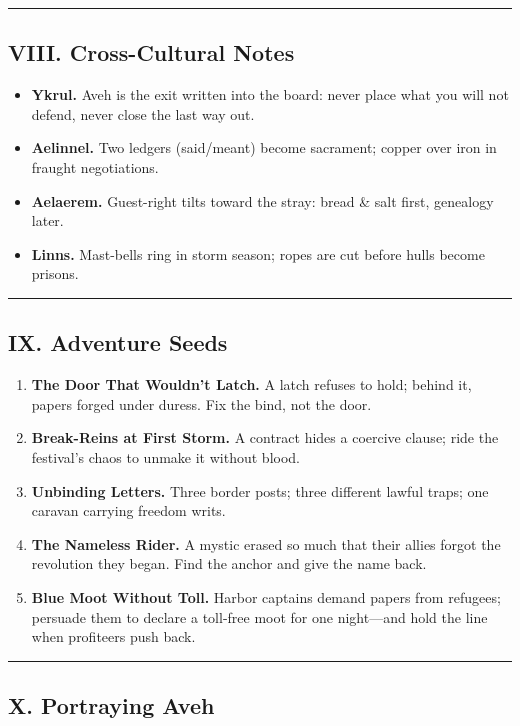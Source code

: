 \documentclass[11pt,letterpaper]{article}
\begin{document}
\medskip\hrule\medskip

\subsection{VIII. Cross-Cultural Notes}

\begin{itemize}[leftmargin=*]
  \item \textbf{Ykrul.} Aveh is the exit written into the board: never place what you will not defend, never close the last way out.
  \item \textbf{Aelinnel.} Two ledgers (said/meant) become sacrament; copper over iron in fraught negotiations.
  \item \textbf{Aelaerem.} Guest-right tilts toward the stray: bread \& salt first, genealogy later.
  \item \textbf{Linns.} Mast-bells ring in storm season; ropes are cut before hulls become prisons.
\end{itemize}

\medskip\hrule\medskip

\subsection{IX. Adventure Seeds}

\begin{enumerate}[leftmargin=*]
  \item \textbf{The Door That Wouldn't Latch.} A latch refuses to hold; behind it, papers forged under duress. Fix the bind, not the door.
  \item \textbf{Break-Reins at First Storm.} A contract hides a coercive clause; ride the festival's chaos to unmake it without blood.
  \item \textbf{Unbinding Letters.} Three border posts; three different lawful traps; one caravan carrying freedom writs.
  \item \textbf{The Nameless Rider.} A mystic erased so much that their allies forgot the revolution they began. Find the anchor and give the name back.
  \item \textbf{Blue Moot Without Toll.} Harbor captains demand papers from refugees; persuade them to declare a toll-free moot for one night---and hold the line when profiteers push back.
\end{enumerate}

\medskip\hrule\medskip

\subsection{X. Portraying Aveh}
\end{document}
